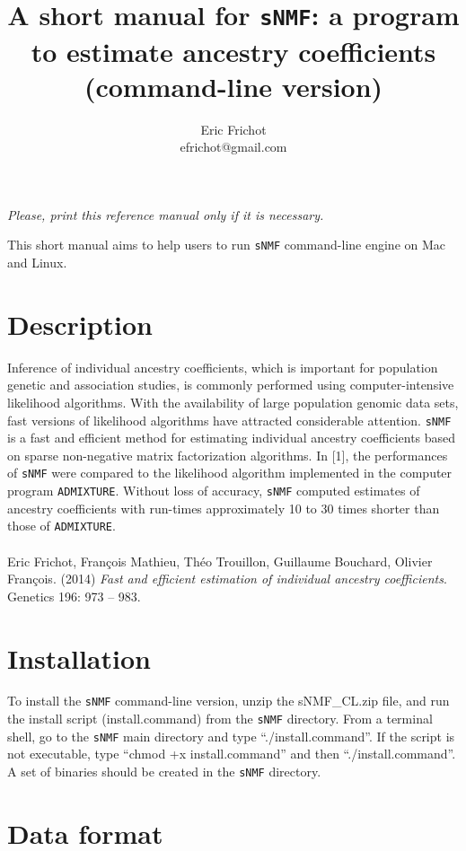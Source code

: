 \documentclass[10pt,a4paper]{article}
\title{\bf \Large A short manual for {\tt sNMF}:
a program to estimate ancestry coefficients\\
\large (command-line version)
}
\author{
        Eric Frichot\\efrichot@gmail.com\\
}
\begin{document}
\maketitle
\begin{center}
{\it Please, print this reference manual only if it is necessary.}
\end{center}

\noindent
This short manual aims to help users to run {\tt sNMF} command-line engine on Mac and Linux. 

\section{Description} 
Inference of individual ancestry coefficients, which is important for population genetic and association studies, is commonly performed using computer-intensive likelihood algorithms. With the availability of large population genomic data sets, fast versions of likelihood algorithms have attracted considerable attention. 
\noindent
{\tt sNMF} is a fast and efficient method for estimating individual ancestry coefficients based on sparse non-negative matrix factorization algorithms. In [1], the performances of {\tt sNMF} were compared to the likelihood algorithm implemented in the computer program {\tt ADMIXTURE}.  Without loss of accuracy, {\tt sNMF} computed estimates of ancestry coefficients with run-times approximately 10 to 30 times shorter than those of {\tt ADMIXTURE}.
\\
\\
\noindent
[1] Eric Frichot, François Mathieu, Théo Trouillon, Guillaume Bouchard, Olivier François. (2014) {\it Fast and efficient estimation of individual ancestry coefficients}. Genetics 196: 973 -- 983. 

\section{Installation} 

\noindent
To install the {\tt sNMF} command-line version, unzip the sNMF\_CL.zip file, and run the 
install script (install.command) from the {\tt sNMF} directory.
From a terminal shell, go to the {\tt sNMF} main directory and type ``./install.command''.
If the script is not executable, type ``chmod +x install.command'' and then ``./install.command''.
A set of binaries should be created in the {\tt sNMF} directory.

\section{Data format}
\end{document}
